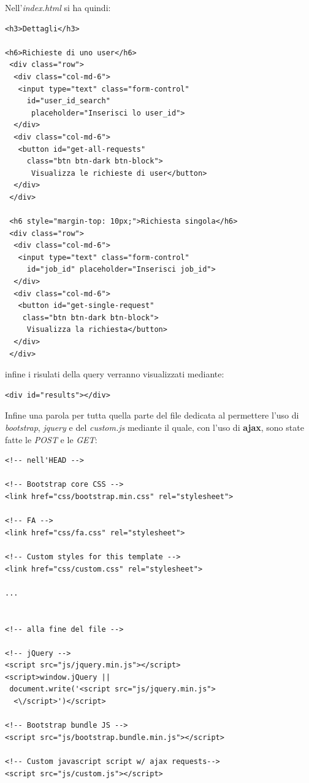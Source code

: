 \documentclass[a4paper,12pt, oneside]{book}
\begin{document}
\newpage
Nell'\textit{index.html} si ha quindi:
\begin{shaded}
\begin{verbatim}
<h3>Dettagli</h3>

<h6>Richieste di uno user</h6>
 <div class="row">
  <div class="col-md-6">
   <input type="text" class="form-control"
     id="user_id_search"
      placeholder="Inserisci lo user_id">
  </div>
  <div class="col-md-6">
   <button id="get-all-requests"
     class="btn btn-dark btn-block">
      Visualizza le richieste di user</button>
  </div>
 </div>

 <h6 style="margin-top: 10px;">Richiesta singola</h6>
 <div class="row">
  <div class="col-md-6">
   <input type="text" class="form-control"
     id="job_id" placeholder="Inserisci job_id">
  </div>
  <div class="col-md-6">
   <button id="get-single-request"
    class="btn btn-dark btn-block">
     Visualizza la richiesta</button>
  </div>
 </div>
\end{verbatim}
\end{shaded}
infine i risulati della query verranno visualizzati mediante:
\begin{shaded}
\begin{verbatim}
<div id="results"></div>
\end{verbatim}
\end{shaded}
\newpage
Infine una parola per tutta quella parte del file dedicata al permettere l'uso di \textit{bootstrap}, \textit{jquery}
e del \textit{custom.js} mediante il quale, con l'uso di \textbf{ajax}, sono state fatte le \textit{POST} e le \textit{GET}:
\begin{shaded}
\begin{verbatim}
<!-- nell'HEAD -->
    
<!-- Bootstrap core CSS -->
<link href="css/bootstrap.min.css" rel="stylesheet">

<!-- FA -->
<link href="css/fa.css" rel="stylesheet">

<!-- Custom styles for this template -->
<link href="css/custom.css" rel="stylesheet">

...


<!-- alla fine del file -->

<!-- jQuery -->
<script src="js/jquery.min.js"></script>
<script>window.jQuery ||
 document.write('<script src="js/jquery.min.js">
  <\/script>')</script>
    
<!-- Bootstrap bundle JS -->
<script src="js/bootstrap.bundle.min.js"></script>

<!-- Custom javascript script w/ ajax requests-->
<script src="js/custom.js"></script>
\end{verbatim}
\end{shaded}
\end{document}
